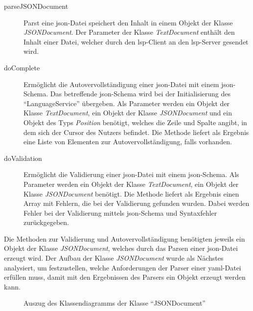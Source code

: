 \begin{description}
  \item[parseJSONDocument]
        Parst eine \ac{json}-Datei speichert den Inhalt in einem Objekt der Klasse \textit{JSONDocument}.
        Der Parameter der Klasse \textit{TextDocument} enthält den Inhalt einer Datei, welcher durch den \ac{lsp}-Client an den \ac{lsp}-Server gesendet wird.
  \item[doComplete]
        Ermöglicht die Autovervollständigung einer \ac{json}-Datei mit einem \ac{json}-Schema. Das betreffende \ac{json}-Schema wird bei der
        Initialisierung des ``LanguageService'' übergeben.
        Als Parameter werden ein Objekt der Klasse \textit{TextDocument}, ein Objekt der Klasse \textit{JSONDocument} und ein Objekt
        des Typs \textit{Position} benötigt, welches die Zeile und Spalte angibt, in dem sich der Cursor des Nutzers befindet.
        Die Methode liefert als Ergebnis eine Liste von Elementen zur Autovervollständigung, falls vorhanden.
  \item[doValidation] Ermöglicht die Validierung einer \ac{json}-Datei mit einem \ac{json}-Schema.
        Als Parameter werden ein Objekt der Klasse \textit{TextDocument}, ein Objekt der Klasse \textit{JSONDocument} benötigt.
        Die Methode liefert als Ergebnis einen Array mit Fehlern, die bei der Validierung gefunden wurden.
        Dabei werden Fehler bei der Validierung mittels \ac{json}-Schema und Syntaxfehler zurückgegeben.
\end{description}

Die Methoden zur Validierung und Autovervollständigung benötigten jeweils ein Objekt der Klasse \textit{JSONDocument}, welches durch das Parsen einer
\ac{json}-Datei erzeugt wird.
Der Aufbau der Klasse \textit{JSONDocument} wurde als Nächstes analysiert, um festzustellen, welche Anforderungen der Parser einer \ac{yaml}-Datei
erfüllen muss, damit mit den Ergebnissen des Parsers ein Objekt erzeugt werden kann.

\begin{figure}[htp] %
  \centering
  \caption{Auszug des Klassendiagramms der Klasse ``JSONDocument''}
  \label{fig:class-diagram-json-document-excerpt}
\end{figure}

